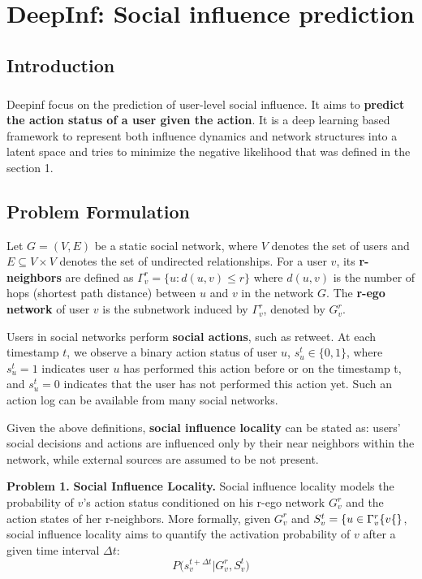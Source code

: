 \chapter{DeepInf: Social influence prediction}


\section{Introduction}
\paragraph{} Deepinf focus on the prediction of user-level social influence. It aims to \textbf{predict the action status of a user given the action}.
It is a deep learning based framework to represent both influence dynamics and network structures into a latent space and 
tries to minimize the negative likelihood that was defined in the section 1.

\section{Problem Formulation}
Let $G=(V,E)$ be a static social network, where $V$ denotes the set of users and $E \subseteq V \times V$ denotes the set of undirected relationships. For a user $v$, its \textbf{r-neighbors} are defined as $\Gamma^r_v = \{u: d(u,v) \le r\}$ where $d(u,v)$ is the number of hops (shortest path distance) between $u$ and $v$ in the network $G$. The \textbf{r-ego network} of user $v$ is the subnetwork induced by $\Gamma^r_v$, denoted by $G^r_v$.

Users in social networks perform \textbf{social actions}, such as retweet. At each timestamp $t$, we observe a binary action status of user $u$, $s_u^t \in \{0,1\}$, where $s_u^t=1$ indicates user $u$ has performed this action before or on the timestamp t, and $s_u^t=0$ indicates that the user has not performed this action yet. Such an action log can be available from many social networks.

Given the above definitions, \textbf{social influence locality} can be stated as: users' social decisions and actions are influenced only by their near neighbors within the network, while external sources are assumed to be not present.

\textbf{Problem 1.} \textbf{Social Influence Locality.} Social influence locality models the probability of $v$'s action status conditioned on his r-ego network $G^r_v$ and the action states of her r-neighbors. More formally, given $G^r_v$ and $S^t_v=\{u\in\Gamma_v^r \\ \{v\{\}$, social influence locality aims to quantify the activation probability of $v$ after a given time interval $\Delta t$: $$P\big(s_v^{t+\Delta t} \vert G^r_v, S^t_v\big)$$

